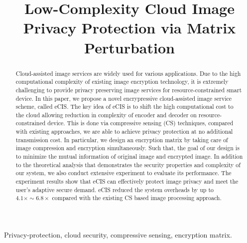 \documentclass[conference]{IEEEtran}
\begin{document}
\title{Low-Complexity Cloud Image Privacy Protection via Matrix Perturbation}


\author{
}

\maketitle

\begin{abstract}
Cloud-assisted image services are widely used for various applications. Due to the high computational complexity of existing image encryption technology, it is extremely challenging to provide privacy preserving image services for resource-constrained smart device. In this paper, we propose a novel encrypressive cloud-assisted image service scheme, called eCIS.  The key idea of eCIS is to shift the high computational cost to the cloud allowing reduction in complexity of encoder and decoder on resource-constrained device. This is done via compressive sensing (CS) techniques, compared with existing approaches, we are able to achieve privacy protection at no additional transmission cost. In particular, we design an encryption matrix  by taking care of  image compression and encryption simultaneously. Such that, the goal of our design is to minimize the mutual information of original image and encrypted image. In addition to the theoretical analysis that demonstrates the security properties and complexity of our system, we also conduct extensive experiment to evaluate its performance. The experiment results show that eCIS  can effectively  protect image privacy and meet the user's adaptive secure demand. eCIS reduced the system overheads by up to  $4.1\times\sim6.8\times$ compared with the existing CS based image processing approach.
\end{abstract}

\begin{keywords}
Privacy-protection, cloud security, compressive sensing, encryption matrix.
\end{keywords}
\end{document}
